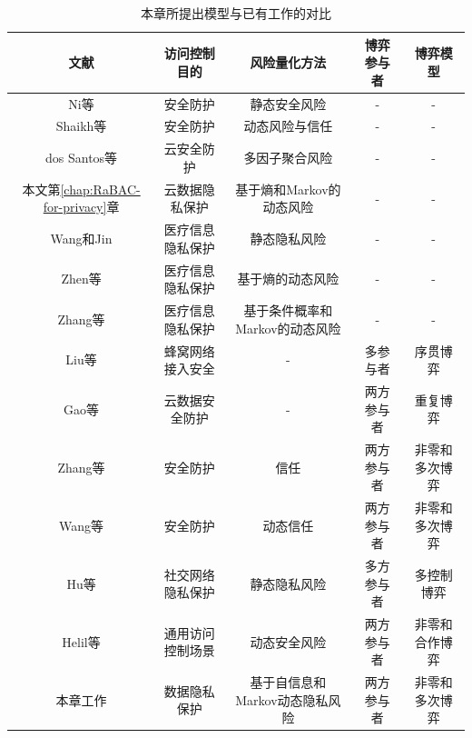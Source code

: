 \begin{table}[htb]
	
	\caption{本章所提出模型与已有工作的对比}\label{tab:comparison}
	\small
	\centering 
	\begin{tabular}{ccccc}
		\toprule
		文献 & 访问控制目的 & 风险量化方法 & 博弈参与者 & 博弈模型 \\
		\hline
		Ni等\cite{ni2010risk} & 安全防护 &静态安全风险&-&-\\ 
		Shaikh等\cite{shaikh2012dynamic} & 安全防护 & 动态风险与信任&-&-\\
		dos Santos等\cite{santos2016framework} &云安全防护 & 多因子聚合风险 &-&-\\
		本文第\ref{chap:RaBAC-for-privacy}章& 云数据隐私保护& 基于熵和Markov的动态风险 & - & -\\
		Wang和Jin\cite{wang2011quantified} & 医疗信息隐私保护 & 静态隐私风险 &-&-\\
		Zhen等\cite{zhen2015risk} & 医疗信息隐私保护& 基于熵的动态风险 & - & -\\
		Zhang等\cite{zhang2018privacy} & 医疗信息隐私保护& 基于条件概率和Markov的动态风险 &-&-\\
		Liu等\cite{liu2016dynamic} & 蜂窝网络接入安全&-&	多参与者&	序贯博弈\\
		Gao等\cite{gao2018game} & 云数据安全防护& -&两方参与者&重复博弈\\
		Zhang等\cite{zhang2015towards} & 安全防护& 信任 & 两方参与者& 非零和多次博弈\\
		Wang等\cite{wang2019game} & 安全防护& 动态信任 & 两方参与者 & 非零和多次博弈\\
		Hu等\cite{hu2014game} & 社交网络隐私保护&静态隐私风险&多方参与者&	多控制博弈\\
		Helil等\cite{helil2017non} & 通用访问控制场景&动态安全风险&两方参与者&非零和合作博弈\\
		本章工作 & 数据隐私保护& 基于自信息和Markov动态隐私风险 & 两方参与者& 非零和多次博弈\\
		\bottomrule 
	\end{tabular}
\end{table}


